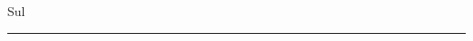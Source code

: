 \documentclass[print,Draft]{faosyb}
\begin{document}
\begin{chart}{S}{ul}
\the\chartheight\par\the\chartwidth\par
\rule{\chartwidth}{\chartheight}
\end{chart}
\lipsum
\end{document}
